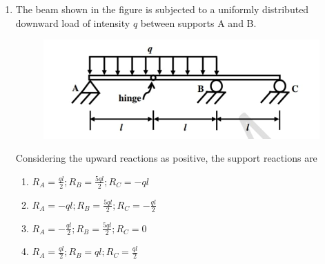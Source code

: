 \documentclass[journal,12pt,onecolumn]{article}
\theoremstyle{remark}
\begin{document}
\begin{enumerate}
    \hfill{}
    \begin{enumerate}
        \item {}-; -; -; -
        \item {}-; -; -; -
        \item {}-; -; -; -
        \item {}-; -; -; -
    \end{enumerate}
    
    \item The beam shown in the figure  is subjected to a uniformly distributed downward load of intensity $q$ between supports A and B.
    \begin{figure}[H]
        \centering
        \includegraphics[width=0.7\columnwidth]{figs/1Q39.jpg}
        \caption{}
        \label{fig:q39}
    \end{figure}
    Considering the upward reactions as positive, the support reactions are
    
    \hfill{}
    \begin{enumerate}
        \item $R_A = \frac{ql}{2}; R_B = \frac{5ql}{2}; R_C = -ql$
        \item $R_A = -ql; R_B = \frac{5ql}{2}; R_C = -\frac{ql}{2}$
        \item $R_A = -\frac{ql}{2}; R_B = \frac{5ql}{2}; R_C = 0$
        \item $R_A = \frac{ql}{2}; R_B = ql; R_C = \frac{ql}{2}$
    \end{enumerate}
    

\end{enumerate}
\end{document}
